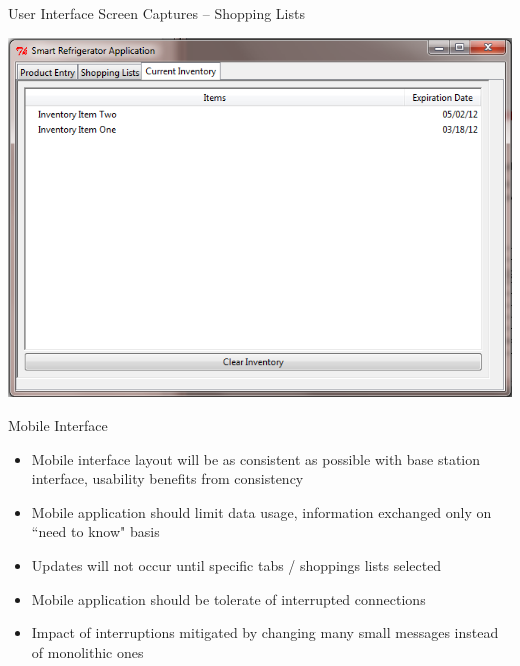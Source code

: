 \documentclass[t]{beamer}
\begin{document}
\begin{frame}{User Interface Screen Captures -- Shopping Lists}
\begin{center}
\includegraphics[scale=0.40]{../Graphics/Screenshot3}
\end{center}
\end{frame}

\begin{frame}{Mobile Interface}
\begin{itemize}
\item Mobile interface layout will be as consistent as possible with base station interface, usability benefits from consistency
\item Mobile application should limit data usage, information exchanged only on ``need to know" basis
\item Updates will not occur until specific tabs / shoppings lists selected
\item Mobile application should be tolerate of interrupted connections
\item Impact of interruptions mitigated by changing many small messages instead of monolithic ones
\end{itemize}
\end{frame}
\end{document}
